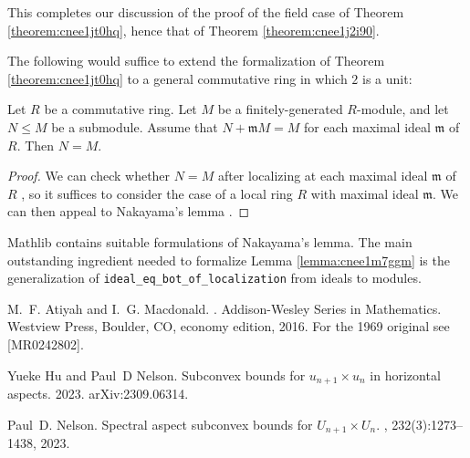 \documentclass[reqno]{amsart} 
\begin{document}
This completes our discussion of the proof of the field case of Theorem \ref{theorem:cnee1jt0hq}, hence that of Theorem \ref{theorem:cnee1j2i90}.

The following would suffice to extend the formalization of Theorem \ref{theorem:cnee1jt0hq} to a general commutative ring in which $2$ is a unit:
\begin{lemma}\label{lemma:cnee1m7ggm}
Let $R$ be a commutative ring.  Let $M$ be a finitely-generated $R$-module, and let $N \leq M$ be a submodule.  Assume that $N + \mathfrak{m} M = M$ for each maximal ideal $\mathfrak{m}$ of $R$.  Then $N = M$.
\end{lemma}
\begin{proof}
  We can check whether $N = M$ after localizing at each maximal ideal $\mathfrak{m}$ of $R$ \cite[Prop 3.9]{MR3525784}, so it suffices to consider the case of a local ring $R$ with maximal ideal $\mathfrak{m}$.  We can then appeal to Nakayama's lemma \cite[Cor 2.7]{MR3525784}.
\end{proof}
\begin{remark}
  Mathlib contains suitable formulations of Nakayama's lemma.  The main outstanding ingredient needed to formalize Lemma \ref{lemma:cnee1m7ggm} is the generalization of \verb|ideal_eq_bot_of_localization| from ideals to modules.
\end{remark}

\def\cprime{$'$} \def\cprime{$'$} \def\cprime{$'$} \def\cprime{$'$}
\begin{thebibliography}{1}

M.~F. Atiyah and I.~G. Macdonald.
.
\newblock Addison-Wesley Series in Mathematics. Westview Press, Boulder, CO,
  economy edition, 2016.
\newblock For the 1969 original see [MR0242802].

Yueke Hu and Paul~D Nelson.
\newblock Subconvex bounds for $u_{n+1}\times u_n$ in horizontal aspects.
 2023.
\newblock arXiv:2309.06314.

Paul~D. Nelson.
\newblock Spectral aspect subconvex bounds for {$U_{n+1} \times U_n$}.
, 232(3):1273--1438, 2023.

\end{thebibliography}
\end{document}
